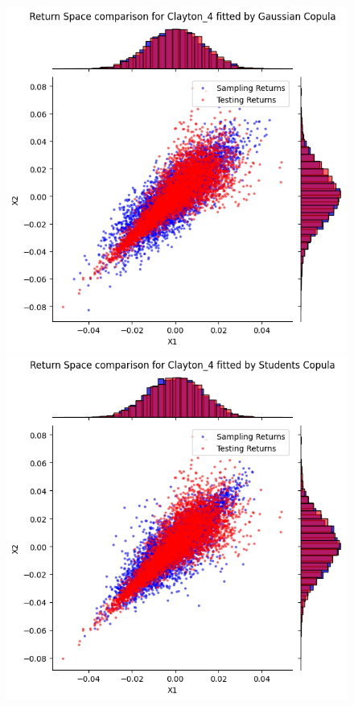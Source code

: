 \begin{figure}
    \centering
    \begin{minipage}{0.4\textwidth}
        \centering
        \includegraphics[width=\textwidth]{5ResultsDiscussion/pictures/PortfolioTest/ResultPortfolio4Gauss.png}
    \end{minipage}
    \hfill
    \begin{minipage}{0.4\textwidth}
        \centering
        \includegraphics[width=\textwidth]{5ResultsDiscussion/pictures/PortfolioTest/ResultPortfolio4Students.png}

\end{minipage}
\end{figure}
